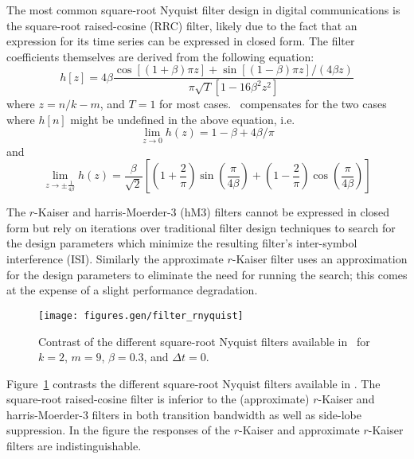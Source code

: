 The most common square-root Nyquist filter design in digital
communications is the square-root raised-cosine (RRC) filter,
likely due to the fact that an expression for its time series can be
expressed in closed form.
The filter coefficients themselves are derived from the following
equation:
%
\begin{equation}
\label{eqn:filter:rrcos}
    h\left[z\right] =
      4\beta \frac{ \cos\left[(1+\beta)\pi z\right] +
                    \sin\left[(1-\beta)\pi z\right] / (4\beta z) }
                  { \pi \sqrt{T}\left[ 1-16\beta^2z^2\right] }
\end{equation}
%
where $z=n/k-m$, and $T=1$ for most cases.
\liquid\ compensates for the two cases where $h[n]$ might be
undefined in the above equation, i.e.
%
\begin{equation}
\label{eqn:filter:rrcos:limit1}
    \mathop {\lim }\limits_{z \to 0 } h(z) = 1 - \beta + 4\beta/\pi
\end{equation}
%
and
%
\begin{equation}
\label{eqn:filter:rrcos:limit2}
    \mathop {\lim }\limits_{z \to \pm \frac{1}{4\beta} } h(z) =
        \frac{\beta}{\sqrt{2}}
        \left[
            \left(1 + \frac{2}{\pi}\right)\sin\left(\frac{\pi}{4\beta}\right) +
            \left(1 - \frac{2}{\pi}\right)\cos\left(\frac{\pi}{4\beta}\right)
        \right]
\end{equation}

The $r$-Kaiser and harris-Moerder-3 (hM3) filters cannot be expressed in
closed form but rely on iterations over traditional filter design
techniques to search for the design parameters which minimize the
resulting filter's inter-symbol interference (ISI).
Similarly the approximate $r$-Kaiser filter uses an approximation for
the design parameters to eliminate the need for running the search;
this comes at the expense of a slight performance degradation.

\begin{figure}
\centering
  \texttt{[image: figures.gen/filter\_rnyquist]}
\caption{Contrast of the different square-root Nyquist filters
         available in \liquid\ for
         $k=2$, $m=9$, $\beta=0.3$, and $\Delta t = 0$.}
\label{fig:module:filter:rnyquist}
\end{figure}
%
Figure~\ref{fig:module:filter:rnyquist} contrasts the different
square-root Nyquist filters available in \liquid.
The square-root raised-cosine filter is inferior to the
(approximate) $r$-Kaiser and harris-Moerder-3 filters in both transition
bandwidth as well as side-lobe suppression.
In the figure the responses of the $r$-Kaiser and approximate $r$-Kaiser
filters are indistinguishable.



